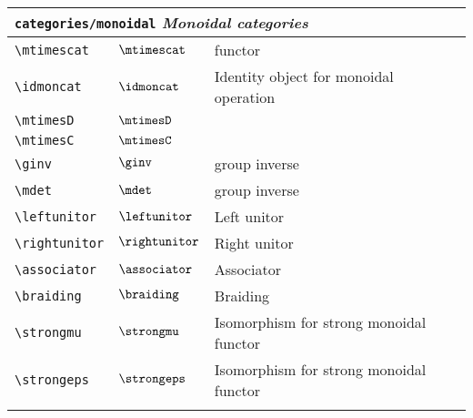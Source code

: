 \begin{longtable}{lll}
  \multicolumn{3}{l}{{\color[rgb]{0.5,0.5,0.5}\texttt{categories/monoidal}} \emph{Monoidal categories}}
  \\
  \hline
  {\color[rgb]{0.5,0.5,0.5}\texttt{\textbackslash mtimescat}}                                               & $\mtimescat$               & functor\\
  {\color[rgb]{0.5,0.5,0.5}\texttt{\textbackslash idmoncat}}                                                & $\idmoncat$                & Identity object for monoidal operation\\
  {\color[rgb]{0.5,0.5,0.5}\texttt{\textbackslash mtimesD}}                                                 & $\mtimesD$                 & \\
  {\color[rgb]{0.5,0.5,0.5}\texttt{\textbackslash mtimesC}}                                                 & $\mtimesC$                 & \\
  {\color[rgb]{0.5,0.5,0.5}\texttt{\textbackslash ginv}}                                                    & $\ginv$                    & group inverse\\
  {\color[rgb]{0.5,0.5,0.5}\texttt{\textbackslash mdet}}                                                    & $\mdet$                    & group inverse\\
  {\color[rgb]{0.5,0.5,0.5}\texttt{\textbackslash leftunitor}}                                              & $\leftunitor$              & Left unitor\\
  {\color[rgb]{0.5,0.5,0.5}\texttt{\textbackslash rightunitor}}                                             & $\rightunitor$             & Right unitor\\
  {\color[rgb]{0.5,0.5,0.5}\texttt{\textbackslash associator}}                                              & $\associator$              & Associator\\
  {\color[rgb]{0.5,0.5,0.5}\texttt{\textbackslash braiding}}                                                & $\braiding$                & Braiding\\
  {\color[rgb]{0.5,0.5,0.5}\texttt{\textbackslash strongmu}}                                                & $\strongmu$                & Isomorphism for strong monoidal functor\\
  {\color[rgb]{0.5,0.5,0.5}\texttt{\textbackslash strongeps}}                                               & $\strongeps$               & Isomorphism for strong monoidal functor                 \\
  &                            &                                                         \\

\end{longtable}
